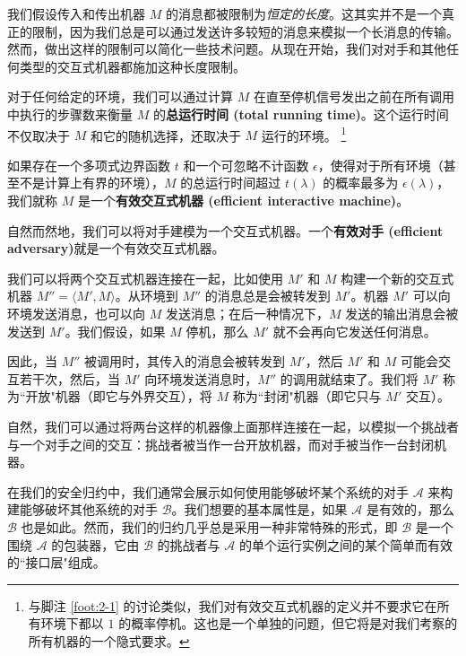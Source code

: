 我们假设传入和传出机器 $M$ 的消息都被限制为\emph{恒定的长度}。这其实并不是一个真正的限制，因为我们总是可以通过发送许多较短的消息来模拟一个长消息的传输。然而，做出这样的限制可以简化一些技术问题。从现在开始，我们对对手和其他任何类型的交互式机器都施加这种长度限制。

对于任何给定的环境，我们可以通过计算 $M$ 在直至停机信号发出之前在所有调用中执行的步骤数来衡量 $M$ 的\textbf{总运行时间 (total running time)}。这个运行时间不仅取决于 $M$ 和它的随机选择，还取决于 $M$ 运行的环境。
\footnote{
与脚注 \ref{foot:2-1} 的讨论类似，我们对有效交互式机器的定义并不要求它在所有环境下都以 $1$ 的概率停机。这也是一个单独的问题，但它将是对我们考察的所有机器的一个隐式要求。
}

\begin{definition}[有效交互式机器]
如果存在一个多项式边界函数 $t$ 和一个可忽略不计函数 $\epsilon$，使得对于所有环境（甚至不是计算上有界的环境），$M$ 的总运行时间超过 $t(\lambda)$ 的概率最多为 $\epsilon(\lambda)$，我们就称 $M$ 是一个\textbf{有效交互式机器 (efficient interactive machine)}。
\end{definition}

自然而然地，我们可以将对手建模为一个交互式机器。一个\textbf{有效对手 (efficient adversary)}就是一个有效交互式机器。

我们可以将两个交互式机器连接在一起，比如使用 $M'$ 和 $M$ 构建一个新的交互式机器 $M''=\langle M',M\rangle$。从环境到 $M''$ 的消息总是会被转发到 $M'$。机器 $M'$ 可以向环境发送消息，也可以向 $M$ 发送消息；在后一种情况下，$M$ 发送的输出消息会被发送到 $M'$。我们假设，如果 $M$ 停机，那么 $M'$ 就不会再向它发送任何消息。

因此，当 $M''$ 被调用时，其传入的消息会被转发到 $M'$，然后 $M'$ 和 $M$ 可能会交互若干次，然后，当 $M'$ 向环境发送消息时，$M''$ 的调用就结束了。我们将 $M'$ 称为``开放"机器（即它与外界交互），将 $M$ 称为``封闭"机器（即它只与 $M'$ 交互）。

\vspace{5pt} 

自然，我们可以通过将两台这样的机器像上面那样连接在一起，以模拟一个挑战者与一个对手之间的交互：挑战者被当作一台开放机器，而对手被当作一台封闭机器。

在我们的安全归约中，我们通常会展示如何使用能够破坏某个系统的对手 $\mathcal{A}$ 来构建能够破坏其他系统的对手 $\mathcal{B}$。我们想要的基本属性是，如果 $\mathcal{A}$ 是有效的，那么 $\mathcal{B}$ 也是如此。然而，我们的归约几乎总是采用一种非常特殊的形式，即 $\mathcal{B}$ 是一个围绕 $\mathcal{A}$ 的包装器，它由 $\mathcal{B}$ 的挑战者与 $\mathcal{A}$ 的单个运行实例之间的某个简单而有效的``接口层"组成。

